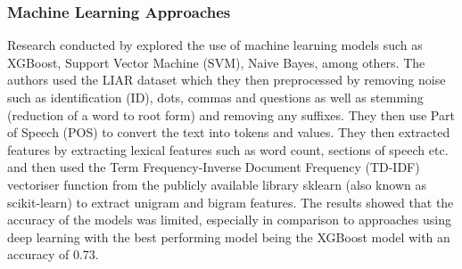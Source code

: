 \documentclass[stu,12pt,floatsintext,donotrepeattitle]{apa7}
\begin{document}
\subsubsection{Machine Learning Approaches}
Research conducted by \parencite{traditional-ml} explored the use of machine learning models such as XGBoost, Support Vector Machine (SVM), Naive Bayes, among others. The authors used the LIAR dataset which they then preprocessed by removing noise such as identification (ID), dots, commas and questions as well as stemming (reduction of a word to root form) and removing any suffixes. They then use Part of Speech (POS) to convert the text into tokens and values. They then extracted features by extracting lexical features such as word count, sections of speech etc. and then used the Term Frequency-Inverse Document Frequency (TD-IDF) vectoriser function from the publicly available library sklearn (also known as scikit-learn) to extract unigram and bigram features. The results showed that the accuracy of the models was limited, especially in comparison to approaches using deep learning with the best performing model being the XGBoost model with an accuracy of 0.73. 
\end{document}
